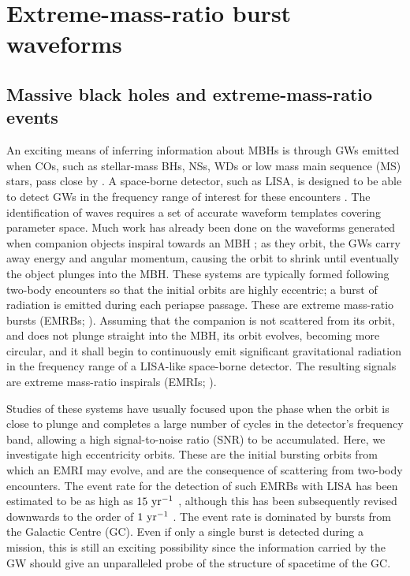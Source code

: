 \chapter{Extreme-mass-ratio burst waveforms\label{ch:waveforms}}

\section{Massive black holes and extreme-mass-ratio events}

An exciting means of inferring information about MBHs is through GWs emitted when COs, such as stellar-mass BHs, NSs, WDs or low mass main sequence (MS) stars, pass close by \citep{Sathyaprakash2009}. A space-borne detector, such as LISA, is designed to be able to detect GWs in the frequency range of interest for these encounters \citep{Danzmann2003, Jennrich2011, Amaro-Seoane2012a}. The identification of waves requires a set of accurate waveform templates covering parameter space. Much work has already been done on the waveforms generated when companion objects inspiral towards an MBH \citep{Glampedakis2005, Barack2009}; as they orbit, the GWs carry away energy and angular momentum, causing the orbit to shrink until eventually the object plunges into the MBH. These systems are typically formed following two-body encounters so that the initial orbits are highly eccentric; a burst of radiation is emitted during each periapse passage. These are extreme mass-ratio bursts (EMRBs; \citealt{Rubbo2006}). Assuming that the companion is not scattered from its orbit, and does not plunge straight into the MBH, its orbit evolves, becoming more circular, and it shall begin to continuously emit significant gravitational radiation in the frequency range of a LISA-like space-borne detector. The resulting signals are extreme mass-ratio inspirals (EMRIs; \citealt{Amaro-Seoane2007}).

Studies of these systems have usually focused upon the phase when the orbit is close to plunge and completes a large number of cycles in the detector's frequency band, allowing a high signal-to-noise ratio (SNR) to be accumulated. Here, we investigate high eccentricity orbits. These are the initial bursting orbits from which an EMRI may evolve, and are the consequence of scattering from two-body encounters. The event rate for the detection of such EMRBs with LISA has been estimated to be as high as $15~\mathrm{yr^{-1}}$ \citep{Rubbo2006}, although this has been subsequently revised downwards to the order of $1~\mathrm{yr^{-1}}$ \citep{Hopman2007}. The event rate is dominated by bursts from the Galactic Centre (GC). Even if only a single burst is detected during a mission, this is still an exciting possibility since the information carried by the GW should give an unparalleled probe of the structure of spacetime of the GC.

